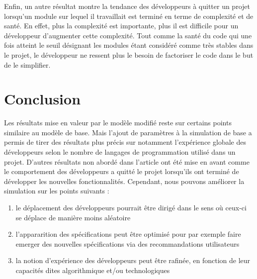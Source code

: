 \documentclass{article}
\begin{document}

Enfin, un autre résultat montre la tendance des développeurs à quitter un projet lorsqu'un module sur lequel il travaillait est terminé en terme de complexité et de santé. En effet, plus la complexité est importante, plus il est difficile pour un développeur d'augmenter cette complexité. Tout comme la santé du code qui une fois atteint le seuil désignant les modules étant considéré comme très stables dans le projet, le développeur ne ressent plus le besoin de factoriser le code dans le but de le simplifier.


\section{Conclusion}
Les résultats mise en valeur par le modèle modifié reste sur certains points similaire au modèle de base.
Mais l'ajout de paramètres à la simulation de base a permis de tirer des
résultats plus précis sur notamment l'expérience globale des développeurs selon le nombre de langages de programmation
utilisé dans un projet. D'autres résultats non abordé dans l'article ont été mise en avant comme le comportement des développeurs
a quitté le projet lorsqu'ils ont terminé de développer les nouvelles fonctionnalités. Cependant, nous pouvons améliorer la simulation sur les
points suivants :
\begin{enumerate}
\item{le déplacement des développeurs pourrait être dirigé dans le sens où ceux-ci se déplace de manière moins aléatoire}
\item{l'appararition des spécifications peut être optimisé pour par exemple faire emerger des nouvelles spécifications via des recommandations utilisateurs}
\item{la notion d'expérience des développeurs peut être rafinée, en
    fonction de leur capacités dites algorithmique et/ou technologiques}
\end{enumerate} 
\end{document}
